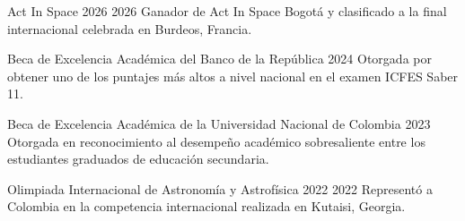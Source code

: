 \cvsection{\AwardsLabel}

\cvaward
{Act In Space 2026}
{2026}
{Ganador de Act In Space Bogotá y clasificado a la final internacional celebrada en Burdeos, Francia.}

\cvaward
{Beca de Excelencia Académica del Banco de la República}
{2024}
{Otorgada por obtener uno de los puntajes más altos a nivel nacional en el examen ICFES Saber 11.}

\cvaward
{Beca de Excelencia Académica de la Universidad Nacional de Colombia}
{2023}
{Otorgada en reconocimiento al desempeño académico sobresaliente entre los estudiantes graduados de educación secundaria.}

\cvaward
{Olimpiada Internacional de Astronomía y Astrofísica 2022}
{2022}
{Representó a Colombia en la competencia internacional realizada en Kutaisi, Georgia.}